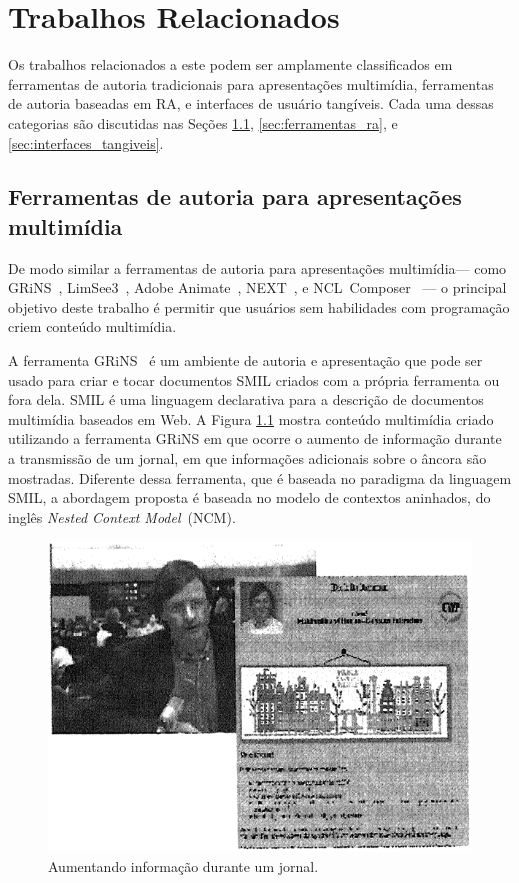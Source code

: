 \documentclass[../main.tex]{subfiles}
\begin{document}
\chapter{Trabalhos Relacionados}\label{cap:relacionados}

Os trabalhos relacionados a este podem ser amplamente classificados em ferramentas de autoria tradicionais para apresentações multimídia, ferramentas de autoria baseadas em RA, e interfaces de usuário tangíveis. Cada uma dessas categorias são discutidas nas Seções \ref{sec:ferramentas_multimidia}, \ref{sec:ferramentas_ra}, e \ref{sec:interfaces_tangiveis}.

\section{Ferramentas de autoria para apresentações multimídia}
\label{sec:ferramentas_multimidia}

De modo similar a ferramentas de autoria para apresentações multimídia--- como GRiNS~\cite{bulterman_grins_1998}, %
LimSee3~\cite{deltour_limsee3_2006}, %
Adobe Animate~\cite{adobe_animate_2017}, %
NEXT~\cite{paulo_de_mattos_next_2013}, %
e NCL~Composer~\cite{azevedo_composer_2014}%
--- o principal objetivo deste trabalho é permitir que usuários sem habilidades com programação criem conteúdo multimídia.

A ferramenta GRiNS~\cite{bulterman_grins_1998} é um ambiente de autoria e apresentação que pode ser usado para criar e tocar documentos SMIL\cite{rutledge2001smil} criados com a própria ferramenta ou fora dela. SMIL é uma linguagem declarativa para a descrição de documentos multimídia baseados em Web. A Figura \ref{fig:grins} mostra conteúdo multimídia criado utilizando a ferramenta GRiNS em que ocorre o aumento de informação durante a transmissão de um jornal, em que informações adicionais sobre o âncora são mostradas. Diferente dessa ferramenta, que é baseada no paradigma da linguagem SMIL, a abordagem proposta é baseada no modelo de contextos aninhados, do inglês \emph{Nested Context Model}~(NCM)\cite{soares_nested_2005}.

\begin{figure}[!h]
\centering
\includegraphics[width=0.5\linewidth]{IMG/Relacionados/grins.png}
\caption{Aumentando informação durante um jornal.}
\label{fig:grins}
\end{figure}
\end{document}
